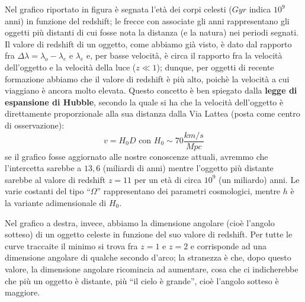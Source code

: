 Nel grafico riportato in figura è segnata l'età dei corpi celesti ($Gyr$ indica $10^9$ anni) in funzione del redshift; le frecce con associate gli anni rappresentano gli oggetti più distanti di cui fosse nota la distanza (e la natura) nei periodi segnati. Il valore di redshift di un oggetto, come abbiamo già visto, è dato dal rapporto fra $\Delta \lambda=\lambda_o-\lambda_e$ e $\lambda_e$ e, per basse velocità, è circa il rapporto fra la velocità dell'oggetto e la velocità della luce ($z \ll 1$); dunque, per oggetti di recente formazione abbiamo che  il valore di redshift è più alto, poichè la velocità a cui viaggiano è ancora molto elevata. Questo concetto è ben spiegato dalla \textbf{legge di espansione di Hubble}, secondo la quale si ha che la velocità dell'oggetto è direttamente proporzionale alla sua distanza dalla Via Lattea (posta come centro di osservazione):
$$v=H_0 D \text{   con } H_0 \sim 70 \frac{km/s}{Mpc}$$
se il grafico fosse aggiornato alle nostre conoscenze attuali, avremmo che l'intercetta sarebbe a $13,6$ (miliardi di anni) mentre l'oggetto più distante sarebbe al valore di redshift $z=11$ per un età di circa $10^9$ (un miliardo) anni. Le varie costanti del tipo ``$\Omega$'' rappresentano dei parametri cosmologici, mentre $h$ è la variante adimensionale di $H_0$.
\vspace{0.05cm}
\\
\begin{minipage}{.60\textwidth}
	Nel grafico a destra, invece, abbiamo la dimensione angolare (cioè l'angolo sotteso) di un oggetto celeste in funzione del suo valore di redshift. Per tutte le curve traccaite il minimo si trova fra $z=1$ e $z=2$ e corrisponde ad una dimensione angolare di qualche secondo d'arco; la stranezza è che, dopo questo valore, la dimensione angolare ricomincia ad aumentare, cosa che ci indicherebbe che più un oggetto è distante, più ``il cielo è grande'', cioè l'angolo sotteso è maggiore.
\end{minipage}
